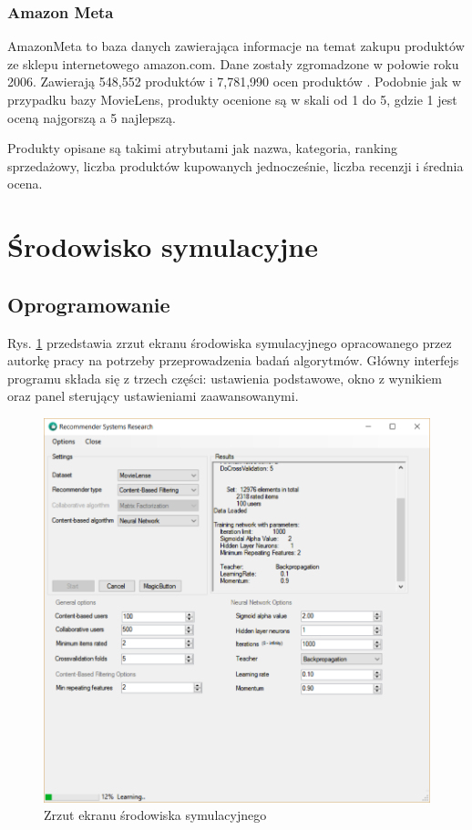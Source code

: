 \documentclass[twoside]{iisthesis}
\begin{document}
		\subsubsection{Amazon Meta}
		AmazonMeta to baza danych zawierająca informacje na temat zakupu produktów ze sklepu internetowego amazon.com. Dane zostały zgromadzone w połowie roku 2006. Zawierają 548,552 produktów i 7,781,990 ocen produktów \cite{amazonmeta, leskovec2007dynamics}. Podobnie jak w przypadku bazy MovieLens, produkty ocenione są w skali od 1 do 5, gdzie 1 jest oceną najgorszą a 5 najlepszą. 
		
		Produkty opisane są takimi atrybutami jak nazwa, kategoria, ranking sprzedażowy, liczba produktów kupowanych jednocześnie, liczba recenzji i średnia ocena.  
		
	\section{Środowisko symulacyjne}
	
		\subsection{Oprogramowanie}
	
		Rys. \ref{fig:program} przedstawia zrzut ekranu środowiska symulacyjnego opracowanego przez autorkę pracy na potrzeby przeprowadzenia badań algorytmów. Główny interfejs programu składa się z trzech części: ustawienia podstawowe, okno z wynikiem oraz panel sterujący ustawieniami zaawansowanymi. 
	
		\begin{figure}[!ht] 
			\centering
			\includegraphics[width=1\textwidth]{program}
			\caption{Zrzut ekranu środowiska symulacyjnego}
			\label{fig:program}
		\end{figure}
	
\end{document}
